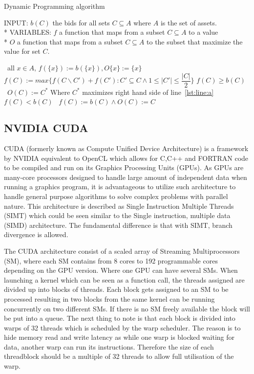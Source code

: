 \documentclass[a4paper, 12pt]{report}
\begin{document}
\begin{algorithm}
\caption{Dynamic Programming algorithm \label{DP}}
INPUT: $b(C)$ the bids for all sets $C \subseteq A$ where $A$ is the set of assets.\\*
VARIABLES: $f$ a function that maps from a subset $C \subseteq A$ to a value\\*
$O$ a function that maps from a subset $C \subseteq A$ to the subset that maximize the value for set $C$.
\begin{algorithmic}[1]
\STATE\algorithmicfor\ all $x \in A$, \algorithmicdo $f(\{x\}):= b(\{x\}),O\{x\}:= \{x\}$ \algorithmicendfor
{}
\STATE $f(C) := max\{f(C\backslash C')+f(C'):C'\subseteq C \wedge 1 \leq \vert C' \vert \leq \dfrac{\vert C \vert}{2}\}$ \label{lst:line:a}
\STATE\algorithmicif $f(C) \geq b(C)$ \algorithmicthen\ $O(C) := C^{*}$ \hfill Where $C^{*}$ maximizes right hand side of line~\ref{lst:line:a} \algorithmicendif
\STATE\algorithmicif $f(C) < b(C)$ \algorithmicthen\ $f(C) := b(C)\wedge O(C) := C$ \algorithmicendif
\ENDFOR
\ENDFOR
\end{algorithmic}
\end{algorithm}

\subsection{NVIDIA CUDA}
CUDA (formerly known as Compute Unified Device Architecture) is a framework by NVIDIA equivalent to OpenCL which allows for C,C++ and FORTRAN code to be compiled and run on its Graphics Processing Units (GPUs). As GPUs are many-core processors designed to handle large amount of independent data when running a graphics program, it is advantageous to utilize such architecture to handle general purpose algorithms to solve complex problems with parallel nature. This architecture is described as Single Instruction Multiple Threads (SIMT) which could be seen similar to the Single instruction, multiple data (SIMD) architecture. The fundamental difference is that with SIMT, branch divergence is allowed.

The CUDA architecture consist of a scaled array of Streaming Multiprocessors (SM), where each SM contains from 8 cores to 192 programmable cores depending on the GPU version. Where one GPU can have several SMs. When launching a kernel which can be seen as a function call, the threads assigned are divided up into blocks of threads. Each block gets assigned to an SM to be processed resulting in two blocks from the same kernel can be running concurrently on two different SMs. If there is no SM freely available the block will be put into a queue. The next thing to note is that each block is divided into warps of 32 threads which is scheduled by the warp scheduler. The reason is to hide memory read and write latency as while one warp is blocked waiting for data, another warp can run its instructions. Therefore the size of each threadblock should be a multiple of 32 threads to allow full utilisation of the warp.
\end{document}
